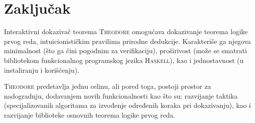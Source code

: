 \documentclass[a4paper,10pt]{article}
\theoremstyle{definition}
\begin{document}
\section{Zaklju\v cak}
\label{sec:zakljucak}

Interaktivni dokazivač teorema \textsc{Theodore} omogućava dokazivanje teorema logike prvog reda, intuicionističkim pravilima prirodne dedukcije. Karakteriše ga njegova minimalnost (što ga čini pogodnim za verifikaciju), proširivost (može se smatrati bibliotekom funkcionalnog programskog jezika \textsc{Haskell}), kao i jednostavnost (u instaliranju i korišćenju). 

\textsc{Theodore} predstavlja jednu celinu, ali pored toga, postoji prostor za nadogradnju, dodavanjem novih funkcionalnosti kao što su: razvijanje taktika (specijalizovanih algoritama za izvođenje određenih koraka pri dokazivanju), kao i razvijanje biblioteke osnovnih teorema logike prvog reda.

\nocite{*}
\printbibliography
\end{document}
